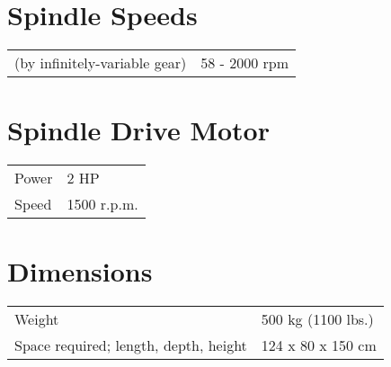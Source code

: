 \section*{Spindle Speeds}
\begin{tabular}{ll}
(by infinitely-variable gear)
    & 58 - 2000 rpm \\
\end{tabular}

\section*{Spindle Drive Motor}
\begin{tabular}{ll}
    Power & 2 HP        \\
    Speed & 1500 r.p.m. \\
\end{tabular}

\section*{Dimensions}
\begin{tabular}{ll}
    Weight                                & 500 kg (1100 lbs.) \\
    Space required; length, depth, height & 124 x 80 x 150 cm  \\
\end{tabular}
